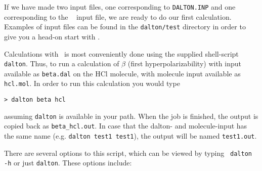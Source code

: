 If we have made two input files, one corresponding to
\verb|DALTON.INP| and one corresponding to the \mol\
 input file, we
are ready to do our first calculation. Examples of input files can be
found in the \verb|dalton/test| directory in order to give you a
head-on start with \siraba .

Calculations with \siraba\ is most conveniently done using the
supplied shell-script \verb|dalton|. Thus,
to run a calculation of
$\beta$ (first hyperpolarizability)
with input available as
\verb|beta.dal| on the HCl molecule, with molecule input available as
\verb|hcl.mol|. In order to run this calculation you would type

\begin{verbatim}
> dalton beta hcl
\end{verbatim}
assuming \verb|dalton| is available in your path. When the job is
finished, the output is copied back as \verb|beta_hcl.out|. In case that the
dalton- and molecule-input has the same name (e.g. \verb|dalton test1 test1|), the output
will be named \verb|test1.out|.

There are several options to this script, which can be viewed by
typing \verb| dalton -h| or just \verb|dalton|. These options include:

